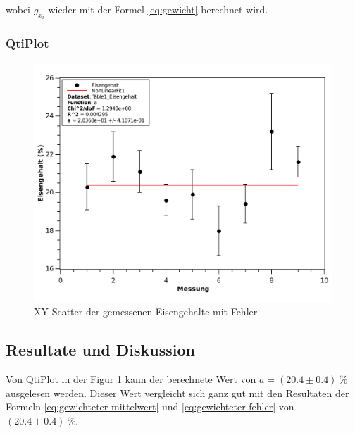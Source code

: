 wobei $g_{\bar{x}_i}$ wieder mit der Formel \ref{eq:gewicht} berechnet wird.


\subsubsection*{QtiPlot}

\begin{figure}[H]
    \center
    \includegraphics[width=.85\textwidth]{qtiplot/eisengehalt}
    \caption{XY-Scatter der gemessenen Eisengehalte mit Fehler}
    \label{fig:eisengehalt}
\end{figure}


\subsection{Resultate und Diskussion}

Von QtiPlot in der Figur \ref{fig:eisengehalt} kann der berechnete Wert von $a=(20.4 \pm 0.4)\SI{}{\percent}$
ausgelesen werden. Dieser Wert vergleicht sich ganz gut mit den Resultaten der Formeln
\ref{eq:gewichteter-mittelwert} und \ref{eq:gewichteter-fehler} von $(20.4 \pm 0.4)\SI{}{\percent}$.

